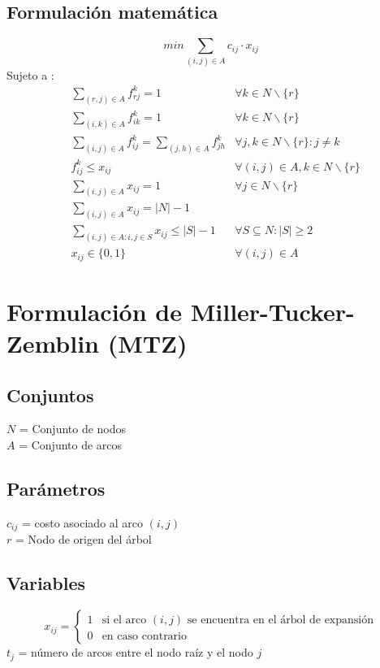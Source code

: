 \documentclass{article}
\numberwithin{equation}{section}
\begin{document}
\subsection{Formulación matemática}
\begin{equation}
min \sum_{(i,j) \in A} c_{ij} \cdot x_{ij}
\end{equation}
Sujeto a : \begin{align}
& \sum_{(r,j) \in A} f_{rj}^k = 1 &\forall k \in N \backslash \{r\}\\
& \sum_{(i,k) \in A} f_{ik}^k = 1 &\forall k \in N \backslash \{r\}\\
& \sum_{(i,j) \in A} f_{ij}^k = \sum_{(j,h) \in A} f_{jh}^k &\forall j,k \in N \backslash \{r\} : j \neq k \\
& f_{ij}^k \leq x_{ij} &\forall (i,j) \in A, k \in N \backslash \{r\}\\
& \sum_{(i,j) \in A} x_{ij} = 1 &\forall j \in N \backslash \{r\}\\
& \sum_{(i,j) \in A} x_{ij} = |N| - 1\\
& \sum_{(i,j) \in A: i,j \in S} x_{ij} \leq |S| - 1 &\forall S \subseteq N : |S| \geq 2 \\
& x_{ij} \in \{0,1\} &\forall (i,j) \in A
\end{align}

\newpage
\section{Formulación de Miller-Tucker-Zemblin (MTZ)}
\subsection{Conjuntos}
$N$ = Conjunto de nodos\\
$A$ = Conjunto de arcos
\subsection{Parámetros}
$c_{ij}$ = costo asociado al arco $(i,j)$\\
$r$ = Nodo de origen del árbol
\subsection{Variables}
\begin{center}
\[x_{ij}={\begin{cases}1&{\mbox{si el arco $(i,j)$ se encuentra en el árbol de expansión}}\\0&{\mbox{en caso contrario}}\end{cases}}
\]
$t_{j}$ = número de arcos entre el nodo raíz y el nodo $j$
\end{center}
\end{document}
